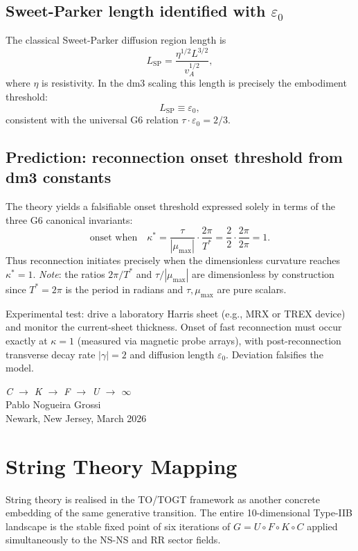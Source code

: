 \section{Sweet-Parker length identified with \(\varepsilon_0\)}

The classical Sweet-Parker diffusion region length is
\[
L_{\text{SP}} = \frac{\eta^{1/2} L^{3/2}}{v_A^{1/2}},
\]
where \(\eta\) is resistivity. In the dm3 scaling this length is precisely the embodiment threshold:
\[
L_{\text{SP}} \equiv \varepsilon_0,
\]
consistent with the universal G6 relation \(\tau \cdot \varepsilon_0 = 2/3\).

\section{Prediction: reconnection onset threshold from dm3 constants}

The theory yields a falsifiable onset threshold expressed solely in terms of the three G6 canonical invariants:
\[
\text{onset when}\quad \kappa^* = \frac{\tau}{|\mu_{\max}|} \cdot \frac{2\pi}{T^*} = \frac{2}{2} \cdot \frac{2\pi}{2\pi} = 1.
\]
Thus reconnection initiates precisely when the dimensionless curvature reaches \(\kappa^* = 1\).
\textit{Note}: the ratios \(2\pi/T^*\) and \(\tau/|\mu_{\max}|\) are dimensionless by construction since \(T^* = 2\pi\) is the period in radians and \(\tau, \mu_{\max}\) are pure scalars.

Experimental test: drive a laboratory Harris sheet (e.g., MRX or TREX device) and monitor the current-sheet thickness. Onset of fast reconnection must occur exactly at \(\kappa = 1\) (measured via magnetic probe arrays), with post-reconnection transverse decay rate \(|\gamma| = 2\) and diffusion length \(\varepsilon_0\). Deviation falsifies the model.

\bigskip
\begin{flushright}
\textit{C \;$\to$\; K \;$\to$\; F \;$\to$\; U \;$\to$\; $\infty$}\\[0.3em]
Pablo Nogueira Grossi\\
Newark, New Jersey, March 2026
\end{flushright}

\chapter{String Theory Mapping}

String theory is realised in the TO/TOGT framework as another concrete embedding of the same generative transition. The entire 10-dimensional Type-IIB landscape is the stable fixed point of six iterations of $G = U \circ F \circ K \circ C$ applied simultaneously to the NS-NS and RR sector fields.

